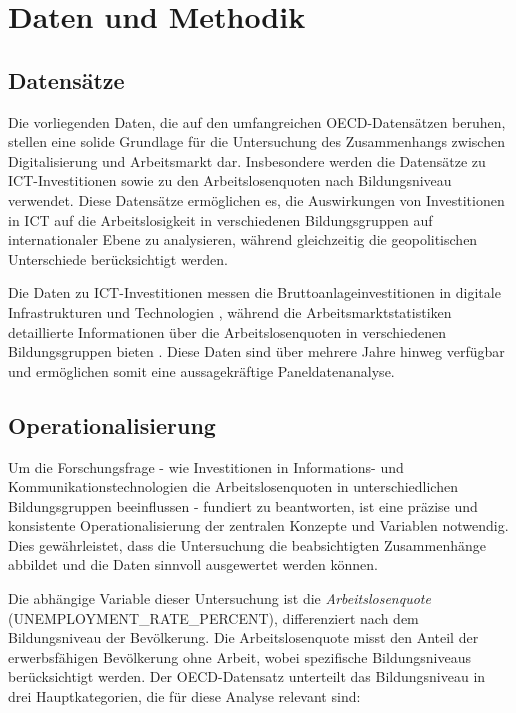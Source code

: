 
\section{Daten und Methodik}


\subsection{Datensätze}

Die vorliegenden Daten, die auf den umfangreichen \ac{OECD}-Datensätzen beruhen, stellen eine 
solide Grundlage für die Untersuchung des Zusammenhangs zwischen Digitalisierung und 
Arbeitsmarkt dar. Insbesondere werden die Datensätze zu \ac{ICT}-Investitionen 
\parencite{oecd2022ict} sowie zu den Arbeitslosenquoten nach Bildungsniveau 
\parencite{oecd2022unemployment} verwendet. Diese Datensätze ermöglichen es, die Auswirkungen 
von Investitionen in \ac{ICT} auf die Arbeitslosigkeit in verschiedenen Bildungsgruppen auf 
internationaler Ebene zu analysieren, während gleichzeitig die geopolitischen Unterschiede 
berücksichtigt werden.

Die Daten zu \ac{ICT}-Investitionen messen die Bruttoanlageinvestitionen in digitale 
Infrastrukturen und Technologien \parencite{oecd2022ict}, während die Arbeitsmarktstatistiken 
detaillierte Informationen über die Arbeitslosenquoten in verschiedenen Bildungsgruppen 
bieten \parencite{oecd2022unemployment}. Diese Daten sind über mehrere Jahre hinweg verfügbar 
und ermöglichen somit eine aussagekräftige Paneldatenanalyse.


\subsection{Operationalisierung}

Um die Forschungsfrage - wie Investitionen in Informations- und Kommunikationstechnologien 
die Arbeitslosenquoten in unterschiedlichen Bildungsgruppen beeinflussen - fundiert zu 
beantworten, ist eine präzise und konsistente Operationalisierung der zentralen Konzepte und 
Variablen notwendig. Dies gewährleistet, dass die Untersuchung die beabsichtigten 
Zusammenhänge abbildet und die Daten sinnvoll ausgewertet werden können.

Die abhängige Variable dieser Untersuchung ist die \textit{Arbeitslosenquote} 
(UNEMPLOYMENT\_RATE\_PERCENT), differenziert nach dem Bildungsniveau der Bevölkerung. Die 
Arbeitslosenquote misst den Anteil der erwerbsfähigen Bevölkerung ohne Arbeit, wobei 
spezifische Bildungsniveaus berücksichtigt werden. Der \ac{OECD}-Datensatz unterteilt das 
Bildungsniveau in drei Hauptkategorien, die für diese Analyse relevant sind:

